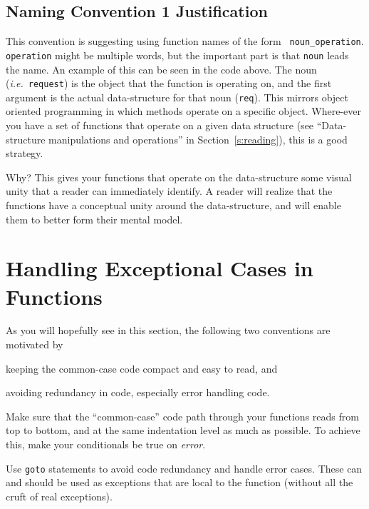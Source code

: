 \documentclass[11pt,onecolumn]{article}
\def\ie{\textit{i.e.}}
\newcommand{\head}[1]{\vspace{0.4em}\noindent{\bf #1}}
\begin{document}
\subsection{Naming Convention 1 Justification}

This convention is suggesting using function names of the form {\tt
  noun\_operation}.  {\tt operation} might be multiple words, but the
important part is that {\tt noun} leads the name.  An example of this
can be seen in the code above.  The noun (\ie\ {\tt request}) is the
object that the function is operating on, and the first argument is
the actual data-structure for that noun ({\tt req}).  This mirrors
object oriented programming %
in which methods
operate on a specific object.  Where-ever you have a set of functions
that operate on a given data structure (see ``Data-structure
manipulations and operations'' in Section~\ref{s:reading}), this is a
good strategy.

Why?  This gives your functions that operate on the data-structure
some visual unity that a reader can immediately identify.  A reader
will realize that the functions have a conceptual unity around the
data-structure, and will enable them to better form their mental
model.


\section{Handling Exceptional Cases in Functions}
\label{s:exception}

As you will hopefully see in this section, the following two
conventions are motivated by
\begin{inparaenum}[(i)]
\item keeping the common-case code compact and easy to read, and 
\item avoiding redundancy in code, especially error handling code.
\end{inparaenum}

\head{Convention 1.} Make sure that the ``common-case'' code path
through your functions reads from top to bottom, and at the same
indentation level as much as possible.  To achieve this, make your
conditionals be true on {\em error}.

\head{Convention 2.} Use {\tt goto} statements to avoid code
redundancy and handle error cases.  These can and should be used as
exceptions that are local to the function (without all the cruft of
real exceptions).
\end{document}

